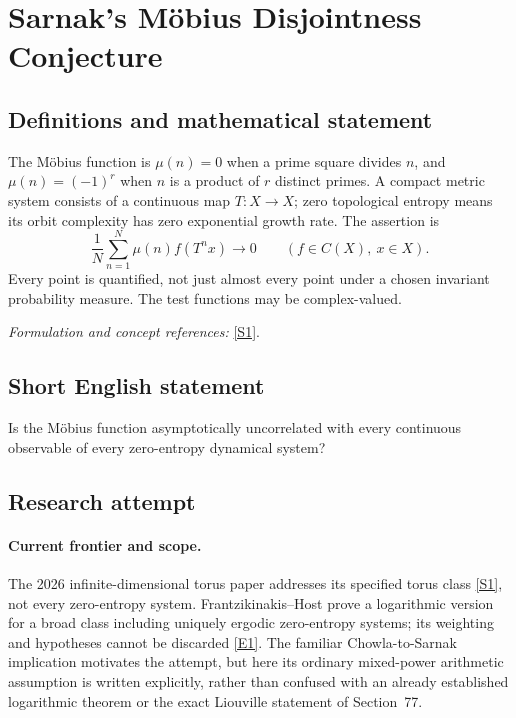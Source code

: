 \documentclass[11pt,a4paper]{article}
\numberwithin{equation}{section}
\newcommand{\sref}[2]{\hyperlink{source:#1:#2}{[S#2]}}
\newcommand{\eref}[2]{\hyperlink{extra:#1:#2}{[E#2]}}
\newif\ifshowcatalogue
\newcommand{\cataloguescope}[1]{\ifshowcatalogue
 \paragraph{Exact scope in the supplied catalogue.}
 \begin{quote}\small #1\end{quote}\fi}
\begin{document}
\setcounter{section}{0}
\section*{\texorpdfstring{Sarnak's Möbius Disjointness Conjecture}{Sarnak's Möbius Disjointness Conjecture}}\label{statement}
\subsection{Definitions and mathematical statement}
The Möbius function is $\mu(n)=0$ when a prime square divides $n$, and $\mu(n)=(-1)^r$ when $n$ is a product of $r$ distinct primes. A compact metric system consists of a continuous map $T:X\to X$; zero topological entropy means its orbit complexity has zero exponential growth rate. The assertion is
\[
 \frac1N\sum_{n=1}^{N}\mu(n)f(T^nx)\longrightarrow0
 \qquad(f\in C(X),\ x\in X).
\]
Every point is quantified, not just almost every point under a chosen invariant probability measure. The test functions may be complex-valued.
\par\smallskip\textit{Formulation and concept references:} \sref{statement}{1}.
\cataloguescope{Prove that for every compact metric topological dynamical system (X,T) of zero topological entropy, every continuous f on X, and every x in X, the average N\textasciicircum{}(-1) sum\_\{n<=N\} mu(n) f(T\textasciicircum{}n x) tends to zero as N tends to infinity.}
\subsection{Short English statement}
Is the Möbius function asymptotically uncorrelated with every continuous observable of every zero-entropy dynamical system?
\subsection{Research attempt}

\paragraph{Current frontier and scope.}
The 2026 infinite-dimensional torus paper addresses its specified torus
class \sref{statement}{1}, not every zero-entropy system. Frantzikinakis--Host
prove a logarithmic version for a broad class including uniquely ergodic
zero-entropy systems; its weighting and hypotheses cannot be discarded
\eref{statement}{1}. The familiar Chowla-to-Sarnak implication motivates the
attempt, but here its ordinary mixed-power arithmetic assumption is
written explicitly, rather than confused with an already established
logarithmic theorem or the exact Liouville statement of Section~77.
\end{document}

